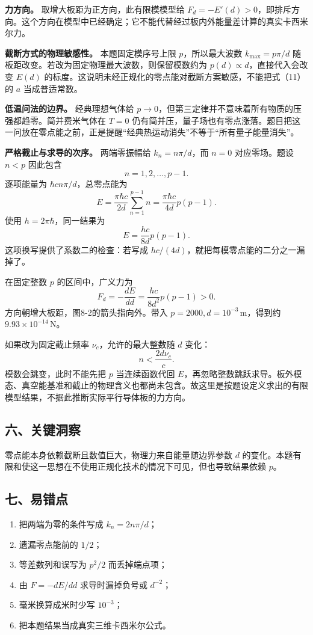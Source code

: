 \documentclass[12pt,a4paper,UTF8]{ctexart}
\newcommand{\tightlist}{\setlength{\itemsep}{0pt}\setlength{\parskip}{0pt}}
\begin{document}
\textbf{力方向。} 取增大板距为正方向，此有限模模型给
\(F_d=-E'(d)>0\)，即排斥方向。这个方向在模型中已经确定；它不能代替经过板内外能量差计算的真实卡西米尔力。

\textbf{截断方式的物理敏感性。} 本题固定模序号上限 \(p\)，所以最大波数
\(k_{\max}=p\pi/d\) 随板距改变。若改为固定物理最大波数，则保留模数约为
\(p(d)\propto d\)，直接代入会改变 \(E(d)\)
的标度。这说明未经正规化的零点能对截断方案敏感，不能把式（11）的 \(a\)
当成普适常数。

\textbf{低温问法的边界。} 经典理想气体给
\(p\to0\)，但第三定律并不意味着所有物质的压强都趋零。简并费米气体在
\(T=0\)
仍有简并压，量子场也有零点涨落。题目把这一问放在零点能之前，正是提醒``经典热运动消失''不等于``所有量子能量消失''。

\textbf{严格截止与求导的次序。} 两端零振幅给 \(k_n=n\pi/d\)，而 \(n=0\)
对应零场。题设 \(n<p\) 因此包含 \[
n=1,2,\ldots,p-1.
\] 逐项能量为 \(\hbar cn\pi/d\)，总零点能为 \[
E=\frac{\pi\hbar c}{2d}\sum_{n=1}^{p-1}n
=\frac{\pi\hbar c}{4d}p(p-1).
\] 使用 \(h=2\pi\hbar\)，同一结果为 \[
E=\frac{hc}{8d}p(p-1).
\] 这项换写提供了系数二的检查：若写成
\(hc/(4d)\)，就把每模零点能的二分之一漏掉了。

在固定整数 \(p\) 的区间中，广义力为 \[
F_d=-\frac{dE}{dd}=\frac{hc}{8d^2}p(p-1)>0.
\] 方向朝增大板距，图8-2的箭头指向外。带入
\(p=2000,d=10^{-3}\,\mathrm m\)，得到约
\(9.93\times10^{-14}\,\mathrm N\)。

如果改为固定截止频率 \(\nu_c\)，允许的最大整数随 \(d\) 变化： \[
n<\frac{2d\nu_c}{c}.
\] 模数会跳变，此时不能先把 \(p\) 当连续函数代回
\(E\)，再忽略整数跳跃求导。板外模态、真空能基准和截止的物理含义也都尚未包含。故这里是按题设定义求出的有限模型结果，不据此推断实际平行导体板的力方向。

\subsection{六、关键洞察}\label{ux516dux5173ux952eux6d1eux5bdf-7}

零点能本身依赖截断且数值巨大，物理力来自能量随边界参数 \(d\)
的变化。本题有限和使这一思想在不使用正规化技术的情况下可见，但也导致结果依赖
\(p\)。

\subsection{七、易错点}\label{ux4e03ux6613ux9519ux70b9-7}

\begin{enumerate}
\def\labelenumi{\arabic{enumi}.}
\tightlist
\item
  把两端为零的条件写成 \(k_n=2n\pi/d\)；
\item
  遗漏零点能前的 \(1/2\)；
\item
  等差数列和误写为 \(p^2/2\) 而丢掉端点项；
\item
  由 \(F=-dE/dd\) 求导时漏掉负号或 \(d^{-2}\)；
\item
  毫米换算成米时少写 \(10^{-3}\)；
\item
  把本题结果当成真实三维卡西米尔公式。
\end{enumerate}
\end{document}

